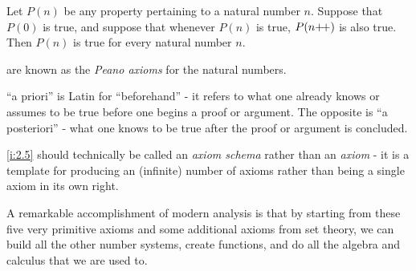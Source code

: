 \begin{ax}\label{i:2.5}
  Let \(P(n)\) be any property pertaining to a natural number \(n\).
  Suppose that \(P(0)\) is true, and suppose that whenever \(P(n)\) is true, \(P(n{+}\!{+})\) is also true.
  Then \(P(n)\) is true for every natural number \(n\).
\end{ax}

\begin{note}
   are known as the \emph{Peano axioms} for the natural numbers.
\end{note}

\begin{note}
  ``a priori'' is Latin for ``beforehand''
  - it refers to what one already knows or assumes to be true before one begins a proof or argument.
  The opposite is ``a posteriori''
  - what one knows to be true after the proof or argument is concluded.
\end{note}

\begin{note}
  \cref{i:2.5} should technically be called an \emph{axiom schema} rather than an \emph{axiom}
  - it is a template for producing an (infinite) number of axioms rather than being a single axiom in its own right.
\end{note}

\begin{note}
  A remarkable accomplishment of modern analysis is that by starting from these five very primitive axioms and some additional axioms from set theory, we can build all the other number systems, create functions, and do all the algebra and calculus that we are used to.
\end{note}
